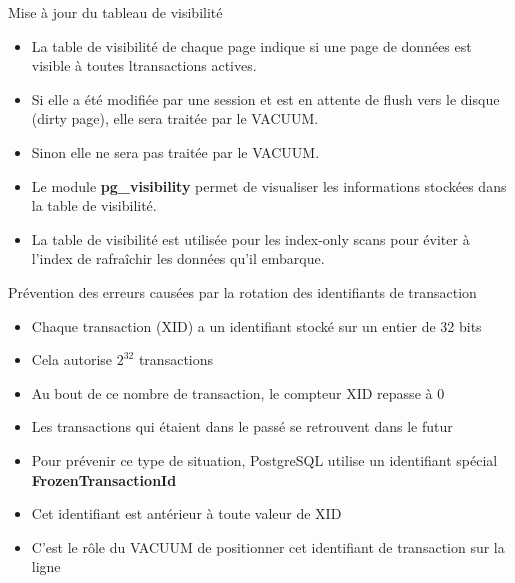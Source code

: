 \begin{frame}{Mise à jour du tableau de visibilité}

\begin{itemize}
   \item La table de visibilité de chaque page indique si une page de données est visible à toutes ltransactions actives.
   \item Si elle a été modifiée par une session et est en attente de flush vers le disque (dirty page), elle sera traitée par le VACUUM.
   \item Sinon elle ne sera pas traitée par le VACUUM.
   \item Le module \textbf{pg\_visibility} permet de visualiser les informations stockées dans la table de visibilité.
   \item La table de visibilité est utilisée pour les index-only scans pour éviter à l'index de rafraîchir les données qu'il embarque.
\end{itemize}

\begin{toile}
\end{toile}
   
\end{frame}


\begin{frame}{Prévention des erreurs causées par la rotation des identifiants de transaction}

\begin{itemize}
   \item Chaque transaction (XID) a un identifiant stocké sur un entier de 32 bits
   \item Cela autorise $2^{32}$ transactions
   \item Au bout de ce nombre de transaction, le compteur XID repasse à 0
   \item Les transactions qui étaient dans le passé se retrouvent dans le futur
   \item Pour prévenir ce type de situation, PostgreSQL utilise un identifiant spécial \textbf{FrozenTransactionId}
   \item Cet identifiant est antérieur à toute valeur de XID
   \item C'est le rôle du VACUUM de positionner cet identifiant de transaction sur la ligne
\end{itemize}

\end{frame}

